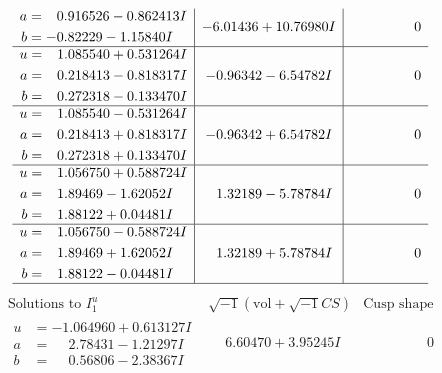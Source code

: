 \documentclass[1p]{elsarticle_modified}
\theoremstyle{definition}
\newcommand{\I}{\sqrt{-1}}
\begin{document}
$$\begin{array}{c|c|c}
\begin{aligned}
a &= \phantom{-}0.916526 - 0.862413 I \\
b &= -0.82229 - 1.15840 I\end{aligned}
 & -6.01436 + 10.76980 I & \phantom{-0.000000 } 0 \\ \hline\begin{aligned}
u &= \phantom{-}1.085540 + 0.531264 I \\
a &= \phantom{-}0.218413 - 0.818317 I \\
b &= \phantom{-}0.272318 - 0.133470 I\end{aligned}
 & -0.96342 - 6.54782 I & \phantom{-0.000000 } 0 \\ \hline\begin{aligned}
u &= \phantom{-}1.085540 - 0.531264 I \\
a &= \phantom{-}0.218413 + 0.818317 I \\
b &= \phantom{-}0.272318 + 0.133470 I\end{aligned}
 & -0.96342 + 6.54782 I & \phantom{-0.000000 } 0 \\ \hline\begin{aligned}
u &= \phantom{-}1.056750 + 0.588724 I \\
a &= \phantom{-}1.89469 - 1.62052 I \\
b &= \phantom{-}1.88122 + 0.04481 I\end{aligned}
 & \phantom{-}1.32189 - 5.78784 I & \phantom{-0.000000 } 0 \\ \hline\begin{aligned}
u &= \phantom{-}1.056750 - 0.588724 I \\
a &= \phantom{-}1.89469 + 1.62052 I \\
b &= \phantom{-}1.88122 - 0.04481 I\end{aligned}
 & \phantom{-}1.32189 + 5.78784 I & \phantom{-0.000000 } 0\\
 \hline 
 \end{array}$$\newpage$$\begin{array}{c|c|c}  
\text{Solutions to }I^u_{1}& \I (\text{vol} + \sqrt{-1}CS) & \text{Cusp shape}\\
 \hline 
\begin{aligned}
u &= -1.064960 + 0.613127 I \\
a &= \phantom{-}2.78431 - 1.21297 I \\
b &= \phantom{-}0.56806 - 2.38367 I\end{aligned}
 & \phantom{-}6.60470 + 3.95245 I & \phantom{-0.000000 } 0 \\ \hline\begin{aligned}

\end{aligned}
\end{array}$$
\end{document}
